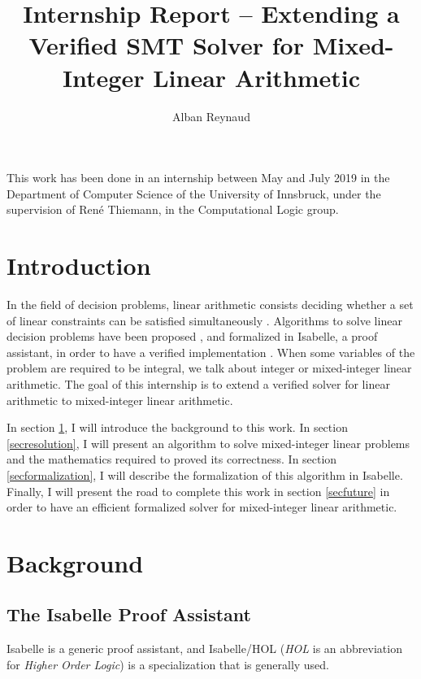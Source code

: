 \documentclass{article}
\title{Internship Report -- Extending a Verified SMT Solver for Mixed-Integer
Linear Arithmetic}
\author{Alban Reynaud}
\date{}
\begin{document}
\maketitle

This work has been done in an internship between May and July 2019
in the Department of Computer Science
of the University of Innsbruck, under the supervision of René Thiemann, in the
Computational Logic group.

\tableofcontents

\pagebreak

\section*{Introduction}
In the field of decision problems, linear arithmetic consists deciding whether
a set of linear constraints can be satisfied simultaneously
\cite[Section 5]{Decision2016}. Algorithms to
solve linear decision problems have been proposed \cite{Dutertre2006},
and formalized in Isabelle, a proof assistant, in order to have a verified
implementation \cite{Spasic2012, BHT2019, Thiemann2018}. When some variables of
the problem are required to be integral, we talk about integer or mixed-integer
linear arithmetic. The goal of this internship is to extend a verified solver
for linear arithmetic to mixed-integer linear arithmetic.

In section \ref{secback}, I will introduce the background to
this work. In section \ref{secresolution}, I will present an algorithm to solve
mixed-integer linear problems and the mathematics required to proved its
correctness.
In section \ref{secformalization}, I will describe the formalization of this
algorithm in Isabelle. Finally, I will present the road to complete this work
in section \ref{secfuture} in order to have an efficient formalized solver for
mixed-integer linear arithmetic.

\section{Background}
\label{secback}

\subsection{The Isabelle Proof Assistant}
Isabelle \cite{Isabelle} is a generic proof assistant, and Isabelle/HOL
(\textit{HOL} is an abbreviation for \textit{Higher Order Logic}) is a
specialization that is generally used.
\end{document}
